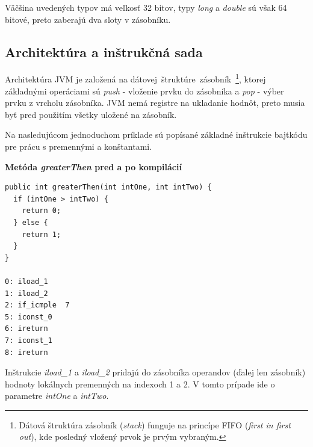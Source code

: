 \documentclass[11pt,final,oneside]{fithesis}
\newenvironment{example}[1]
{
\vspace{3mm}
\noindent\textbf{#1}
\vspace{2mm}
}
{
\vspace{3mm}
}
\begin{document}
Väčšina uvedených typov má veľkosť 32 bitov, typy \textit{long} a
\textit{double} sú však 64 bitové, preto zaberajú dva sloty v zásobníku.

\subsection{Architektúra a inštrukčná sada}
Architektúra JVM je založená na dátovej~štruktúre~zásobník~\footnote{Dátová
štruktúra zásobník (\textit{stack}) funguje na princípe FIFO (\textit{first in
first out}), kde posledný vložený prvok je prvým vybraným.}, ktorej základnými
operáciami sú \textit{push} - vloženie prvku do zásobníka a \textit{pop} - 
výber prvku z vrcholu zásobníka. JVM nemá registre na ukladanie hodnôt, preto 
musia byť pred použitím všetky uložené na zásobník.

Na nasledujúcom jednoduchom príklade sú popísané základné inštrukcie bajtkódu
pre prácu s premennými a konštantami.

\begin{example}{Metóda \textit{greaterThen} pred a po kompilácií}
\begin{verbatim}
public int greaterThen(int intOne, int intTwo) {
  if (intOne > intTwo) {
    return 0;
  } else {
    return 1;
  }
}

0: iload_1
1: iload_2
2: if_icmple  7
5: iconst_0
6: ireturn
7: iconst_1
8: ireturn
\end{verbatim}
\end{example}

Inštrukcie \textit{iload\_1} a \textit{iload\_2} pridajú do zásobníka operandov
(ďalej len zásobník) hodnoty lokálnych premenných na indexoch 1 a 2. V tomto 
prípade ide o parametre \textit{intOne} a \textit{intTwo}. 
\end{document}
